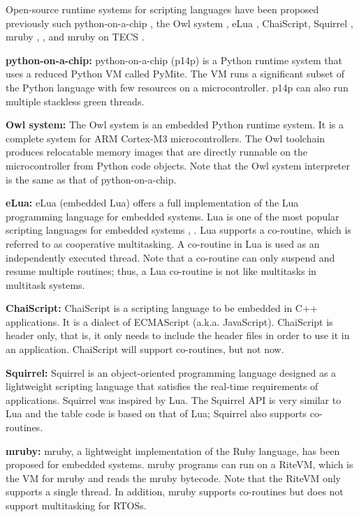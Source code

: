 \documentclass[S,R,E]{article/compsoft}
\begin{document}
Open-source runtime systems for scripting languages have been proposed previously such python-on-a-chip \cite{url:python-on-a-chip}, the Owl system \cite{par:owl}, eLua \cite{url:eLua}, ChaiScript\cite{url:ChaiScript}, Squirrel \cite{url:Squirrel}, mruby \cite{par:mruby}, \cite{url:mruby}, and mruby on TECS \cite{par:mrubyonTECS}.

{\bf python-on-a-chip:} python-on-a-chip (p14p) is a Python runtime system that uses a reduced Python VM called PyMite.
The VM runs a significant subset of the Python language with few resources on a microcontroller.
p14p can also run multiple stackless green threads.

{\bf Owl system:} The Owl system is an embedded Python runtime system.
It is a complete system for ARM Cortex-M3 microcontrollers.
The Owl toolchain produces relocatable memory images that are directly runnable on the microcontroller from Python code objects.
Note that the Owl system interpreter is the same as that of python-on-a-chip.

{\bf eLua:} eLua (embedded Lua) offers a full implementation of the Lua programming language for embedded systems.
Lua is one of the most popular scripting languages for embedded systems \cite{url:Lua}, \cite{par:Lua}.
Lua supports a co-routine, which is referred to as cooperative multitasking.
A co-routine in Lua is used as an independently executed thread.
Note that a co-routine can only suspend and resume multiple routines; thus, a Lua co-routine is not like multitasks in multitask systems.

{\bf ChaiScript:} ChaiScript is a scripting language to be embedded in C++ applications.
It is a dialect of ECMAScript (a.k.a. JavaScript).
ChaiScript is header only, that is, it only needs to include the header files in order to use it in an application.
ChaiScript will support co-routines, but not now. 

{\bf Squirrel:} Squirrel is an object-oriented programming language designed as a lightweight scripting language that satisfies the real-time requirements of applications.
Squirrel was inspired by Lua.
The Squirrel API is very similar to Lua and the table code is based on that of Lua; Squirrel also supports co-routines.

{\bf mruby:} mruby, a lightweight implementation of the Ruby language, has been proposed for embedded systems.
mruby programs can run on a RiteVM, which is the VM for mruby and reads the mruby bytecode.
Note that the RiteVM only supports a single thread.
In addition, mruby supports co-routines but does not support multitasking for RTOSs.
\end{document}
